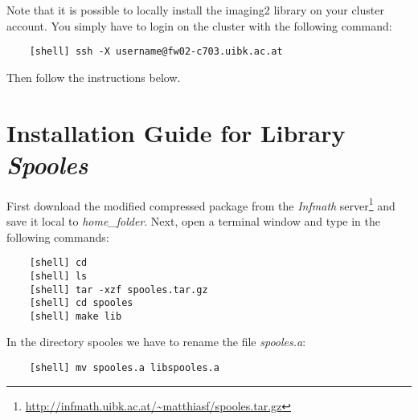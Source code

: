 \documentclass[a4paper,10pt]{article}
\begin{document}
Note that it is possible to locally install the imaging2 library on your cluster account.
You simply have to login on the cluster with the following command:
\begin{verbatim}
    [shell] ssh -X username@fw02-c703.uibk.ac.at
\end{verbatim}
Then follow the instructions below.
 

\section{Installation Guide for Library \emph{Spooles}}
First download the modified compressed package from the \emph{Infmath} server\footnote{\url{http://infmath.uibk.ac.at/~matthiasf/spooles.tar.gz}}
and save it local to \emph{home\_folder}. Next, open a terminal window and type in the
following commands:
\begin{verbatim}
    [shell] cd
    [shell] ls
    [shell] tar -xzf spooles.tar.gz
    [shell] cd spooles
    [shell] make lib
\end{verbatim}
In the directory spooles we have to rename the file \emph{spooles.a}:
\begin{verbatim}
    [shell] mv spooles.a libspooles.a
\end{verbatim}
\end{document}
